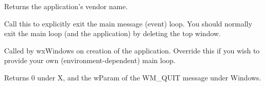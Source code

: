 

\label{wxappgetvendorname}


Returns the application's vendor name.


\label{wxappexitmainloop}


Call this to explicitly exit the main message (event) loop.
You should normally exit the main loop (and the application) by deleting
the top window.


\label{wxappmainloop}


Called by wxWindows on creation of the application. Override this if you wish
to provide your own (environment-dependent) main loop.


Returns 0 under X, and the wParam of the WM\_QUIT message under Windows.



\label{wxapponassert}

